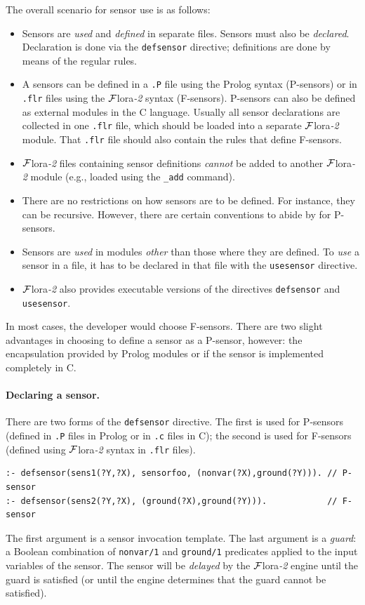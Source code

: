 \documentclass[11pt]{article}
\newcommand{\FLORA}{{\mbox{\sc ${\cal F}${lora}\rm\emph{-2}}}\xspace}
\begin{document}
The overall scenario for sensor use is as follows:
\begin{itemize}
\item  Sensors are \emph{used} and \emph{defined} in separate files.
  Sensors must also be \emph{declared}. 
  Declaration is done via the
  \texttt{defsensor} directive; definitions are done by means of the
  regular rules.
\item
  A sensors can be defined in a \texttt{.P} file
  using the Prolog syntax (P-sensors)  or in
  \texttt{.flr} files using the \FLORA syntax (F-sensors). 
  P-sensors can also be defined as external modules in the C language.
  Usually all sensor declarations are collected in one \texttt{.flr}
  file, which should be loaded into a separate \FLORA module. That
  \texttt{.flr} file 
  should also contain the rules that define F-sensors. 
\item 
  \FLORA files containing sensor definitions \emph{cannot} be added to
  another \FLORA module (e.g., loaded 
  using the \texttt{\_add} command).
\item
  There are no restrictions on how sensors are to be defined. For instance,
  they can be recursive. However, there are certain conventions to abide by
  for P-sensors.
\item  Sensors are \emph{used} in modules \emph{other} than those where they
  are defined. To \emph{use} a sensor in a file, it has to be declared
  in that file with the \texttt{usesensor} directive.
\item \FLORA also provides executable versions of the directives 
  \texttt{defsensor} and \texttt{usesensor}.  
\end{itemize}

In most cases, the developer would choose F-sensors. There are two slight
advantages in choosing to define a sensor as a P-sensor, however: the encapsulation
provided by Prolog modules or if the sensor is implemented completely in C.

\paragraph{Declaring a sensor.}
There are two forms of the \texttt{defsensor} directive. The first is used for
P-sensors (defined in \texttt{.P} files in Prolog or in \texttt{.c} files
in C); the second is used for
F-sensors (defined using \FLORA syntax in \texttt{.flr} files).
\begin{verbatim}
:- defsensor(sens1(?Y,?X), sensorfoo, (nonvar(?X),ground(?Y))). // P-sensor
:- defsensor(sens2(?Y,?X), (ground(?X),ground(?Y))).            // F-sensor
\end{verbatim}
The first argument is a sensor invocation template.  The last argument
is a \emph{guard}: a Boolean combination of \texttt{nonvar/1} and
\texttt{ground/1} predicates applied to the input variables of the
sensor. The sensor will be \emph{delayed} by the \FLORA engine until the
guard is satisfied (or until the engine determines that the guard cannot be
satisfied).
\end{document}
